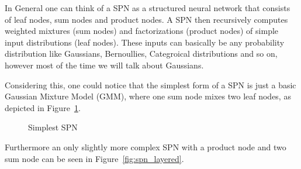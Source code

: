 In General one can think of a SPN as a structured neural network that consists of leaf nodes, sum nodes and product 
nodes. A SPN then recursively computes weighted mixtures (sum nodes) and factorizations (product nodes) of simple input distributions (leaf nodes). 
These inputs can basically be any probability distribution like Gaussians, Bernoullies, Categroical distributions and so on,
however most of the time we will talk about Gaussians.

Considering this, one could notice that the simplest form of a SPN is just a basic 
Gaussian Mixture Model (GMM), where one sum node mixes two leaf nodes, as depicted in Figure~\ref{fig:spn_gmm}.

\begin{figure}[h!]
    \centering
    \caption{Simplest SPN}
    \label{fig:spn_gmm}
\end{figure}
Furthermore an only slightly more complex SPN with a product node and two sum node can be seen in Figure~\ref{fig:spn_layered}. 

